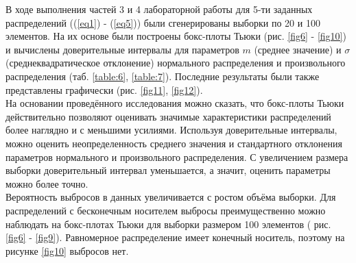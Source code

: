 В ходе выполнения частей 3 и 4 лабораторной работы для 5-ти заданных распределений ((\ref{eq1}) - (\ref{eq5})) были сгенерированы выборки по 20 и 100 элементов. На их основе были построены бокс-плоты Тьюки (рис. \ref{fig6} - \ref{fig10}) и вычислены доверительные интервалы для параметров $m$ (среднее значение) и $\sigma$ (среднеквадратическое отклонение) нормального распределения и произвольного распределения (таб. \ref{table:6}, \ref{table:7}). Последние результаты были также представлены графически (рис. \ref{fig11}, \ref{fig12}).\\
На основании проведённого исследования можно сказать, что бокс-плоты Тьюки действительно позволяют оценивать значимые характеристики распределений более наглядно и с меньшими усилиями. Используя доверительные интервалы, можно оценить неопределенность среднего значения и стандартного отклонения параметров нормального и произвольного распределения. С увеличением размера выборки доверительный интервал уменьшается, а значит, оценить параметры можно более точно.\\
Вероятность выбросов в данных увеличивается с ростом объёма выборки. Для распределений с бесконечным носителем выбросы преимущественно можно наблюдать на бокс-плотах Тьюки для выборки размером 100 элементов ( рис. \ref{fig6} - \ref{fig9}). Равномерное распределение имеет конечный носитель, поэтому на рисунке \ref{fig10} выбросов нет.

